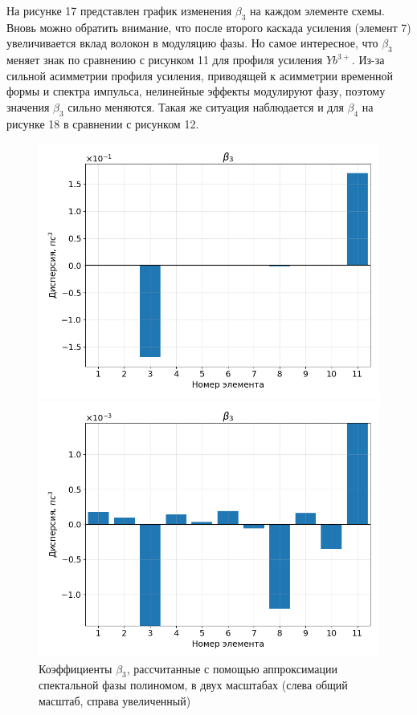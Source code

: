 \documentclass[12pt]{article}
\begin{document}
На рисунке 17 представлен график изменения $\beta_3$ на каждом элементе схемы. Вновь можно обратить внимание, что после
второго каскада усиления (элемент 7) увеличивается вклад волокон в модуляцию фазы. Но самое интересное, что $\beta_3$
меняет знак по сравнению с рисунком 11 для профиля усиления $Yb^{3+}$. Из-за сильной асимметрии профиля усиления,
приводящей к асимметрии временной формы и спектра импульса, нелинейные эффекты модулируют фазу, поэтому значения $\beta_3$
сильно меняются. Такая же ситуация наблюдается и для $\beta_4$ на рисунке 18 в сравнении с рисунком 12.

\begin{figure}[h!]
    \centering
    \begin{minipage}[b]{0.5\textwidth}
        \includegraphics[width=\linewidth]{Images/Gauss Pulse Parabolic Profile/Беты/beta_3_full}
    \end{minipage}%
    \begin{minipage}[b]{0.5\textwidth}
        \includegraphics[width=\linewidth]{Images/Gauss Pulse Parabolic Profile/Беты/beta_3_cut}
    \end{minipage}

    \caption{Коэффициенты $\beta_3$, рассчитанные с помощью аппроксимации спектальной фазы полиномом,
     в двух масштабах (слева общий масштаб, справа увеличенный)}
    \label{fig:both}
\end{figure}
\end{document}
